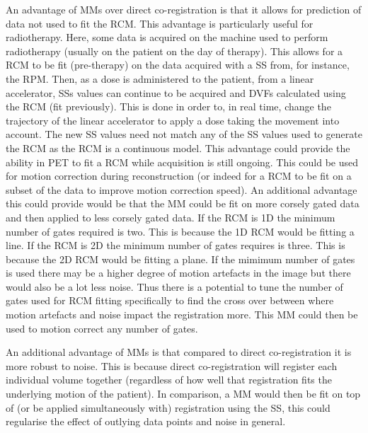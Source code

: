             An advantage of \glspl{MM} over direct co-registration is that it allows for prediction of data not used to fit the \gls{RCM}. This advantage is particularly useful for radiotherapy. Here, some data is acquired on the machine used to perform radiotherapy (usually on the patient on the day of therapy). This allows for a \gls{RCM} to be fit (pre-therapy) on the data acquired with a \gls{SS} from, for instance, the \gls{RPM}. Then, as a dose is administered to the patient, from a linear accelerator, \glspl{SS} values can continue to be acquired and \glspl{DVF} calculated using the \gls{RCM} (fit previously). This is done in order to, in real time, change the trajectory of the linear accelerator to apply a dose taking the movement into account. The new \gls{SS} values need not match any of the \gls{SS} values used to generate the \gls{RCM} as the \gls{RCM} is a continuous model. This advantage could provide the ability in \gls{PET} to fit a \gls{RCM} while acquisition is still ongoing. This could be used for motion correction during reconstruction (or indeed for a \gls{RCM} to be fit on a subset of the data to improve motion correction speed). An additional advantage this could provide would be that the \gls{MM} could be fit on more corsely gated data and then applied to less corsely gated data. If the \gls{RCM} is \gls{1D} the minimum number of gates required is two. This is because the \gls{1D} \gls{RCM} would be fitting a line. If the \gls{RCM} is \gls{2D} the minimum number of gates requires is three. This is because the \gls{2D} \gls{RCM} would be fitting a plane. If the mimimum number of gates is used there may be a higher degree of motion artefacts in the image but there would also be a lot less noise. Thus there is a potential to tune the number of gates used for \gls{RCM} fitting specifically to find the cross over between where motion artefacts and noise impact the registration more. This \gls{MM} could then be used to motion correct any number of gates.
            
            An additional advantage of \glspl{MM} is that compared to direct co-registration it is more robust to noise. This is because direct co-registration will register each individual volume together (regardless of how well that registration fits the underlying motion of the patient). In comparison, a \gls{MM} would then be fit on top of (or be applied simultaneously with) registration using the \gls{SS}, this could regularise the effect of outlying data points and noise in general.
            
